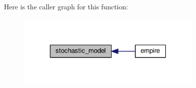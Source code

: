 Here is the caller graph for this function\-:\nopagebreak
\begin{figure}[H]
\begin{center}
\leavevmode
\includegraphics[width=256pt]{stochastic__model_8f90_ac824cdcc59bee27acef82df04a13e009_icgraph}
\end{center}
\end{figure}


